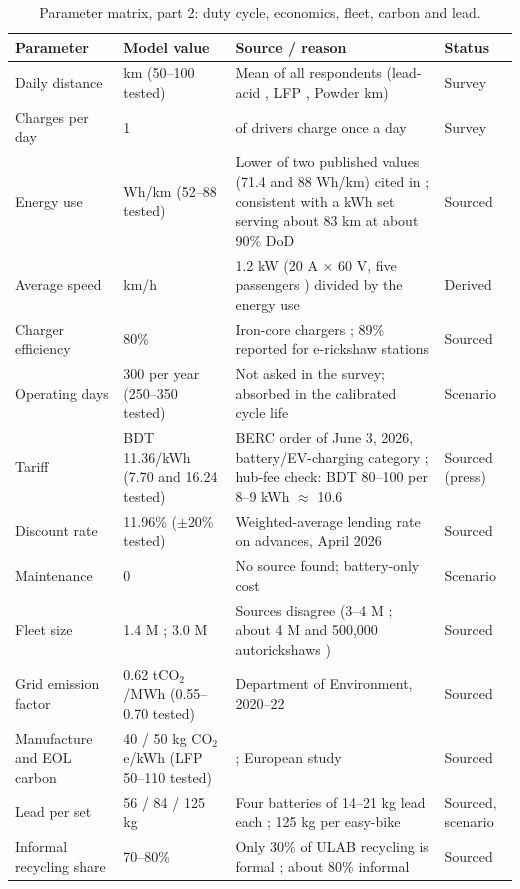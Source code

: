 \begin{table}[t]
\caption{Parameter matrix, part 2: duty cycle, economics, fleet, carbon and lead.}
\label{tab:params2}
\centering\footnotesize
\renewcommand{\arraystretch}{1.1}
\begin{tabular}{p{2.5cm}p{3.3cm}p{6.8cm}p{1.8cm}}
\hline
Parameter & Model value & Source / reason & Status \\
\hline
Daily distance & \kmUsed{} km (50--100 tested) & Mean of all \nSurvey{} respondents (lead-acid \kmMeanLA{}, LFP \kmMeanLFP{}, Powder \kmMeanPW{} km) & Survey \\
Charges per day & 1 & \onePerDay{} of \nSurvey{} drivers charge once a day & Survey \\
Energy use & \ekmUsed{} Wh/km (52--88 tested) & Lower of two published values (71.4 and 88 Wh/km) cited in \cite{peakdemand}; consistent with a \packKWh{} kWh set serving about 83 km at about 90\% DoD & Sourced \\
Average speed & \speedUsed{} km/h & 1.2 kW (20 A $\times$ 60 V, five passengers \cite{chowdhury2026}) divided by the energy use & Derived \\
Charger efficiency & 80\% & Iron-core chargers \cite{chowdhury2026}; 89\% reported for e-rickshaw stations \cite{hasan2020} & Sourced \\
Operating days & 300 per year (250--350 tested) & Not asked in the survey; absorbed in the calibrated cycle life & Scenario \\
Tariff & BDT 11.36/kWh (7.70 and 16.24 tested) & BERC order of June 3, 2026, battery/EV-charging category \cite{berc2026fe,fenews2026}; hub-fee check: BDT 80--100 per 8--9 kWh $\approx$ 10.6 \cite{chowdhury2026} & Sourced (press) \\
Discount rate & 11.96\% ($\pm$20\% tested) & Weighted-average lending rate on advances, April 2026 \cite{ceic_lending} & Sourced \\
Maintenance & 0 & No source found; battery-only cost & Scenario \\
Fleet size & 1.4 M \cite{clean2024}; 3.0 M & Sources disagree (3--4 M \cite{pureearth_smep}; about 4 M and 500{,}000 autorickshaws \cite{unctad_smep}) & Sourced \\
Grid emission factor & 0.62 tCO$_2$/MWh (0.55--0.70 tested) & Department of Environment, 2020--22 \cite{doe_gef} & Sourced \\
Manufacture and EOL carbon & 40 / 50 kg CO$_2$e/kWh (LFP 50--110 tested) & \cite{jasper2025}; European study & Sourced \\
Lead per set & 56 / 84 / 125 kg & Four batteries of 14--21 kg lead each \cite{smep2024}; 125 kg per easy-bike \cite{fe2024,pureearth_smep} & Sourced, scenario \\
Informal recycling share & 70--80\% & Only 30\% of ULAB recycling is formal \cite{fe2024}; about 80\% informal \cite{unctad_smep} & Sourced \\
\hline
\end{tabular}
\end{table}
